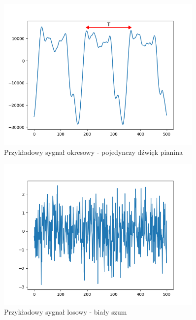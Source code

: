 \begin{figure}[htb]
    \centering
    \includegraphics[width=0.9\textwidth]{images/sygnal_okresowy}
    \caption{Przykładowy sygnał okresowy - pojedynczy dźwięk pianina}
    \label{fig:sygnal_okresowy}
\end{figure}

\begin{figure}[htb]
    \centering
    \includegraphics[width=0.9\textwidth]{images/sygnal_losowy}
    \caption{Przykładowy sygnał losowy - biały szum}
    \label{fig:sygnal_losowy}
\end{figure}

